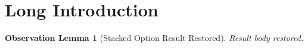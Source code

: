 \section[Short Intro]{Long Introduction}
\newtheorem{oblemma}{Observation Lemma}[section]
\begin{oblemma}[Stacked Option Result Restored]\label{obs:main}
Result body restored.
\end{oblemma}
